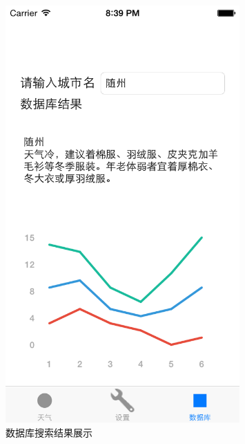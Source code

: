 \documentclass[UTF8,nofonts]{ctexart}
\begin{document}
\begin{figure}[hbt]
\centering
\includegraphics[width=0.8\textwidth]{9.png}
\caption{数据库搜索结果展示}
\end{figure}
\end{document}

